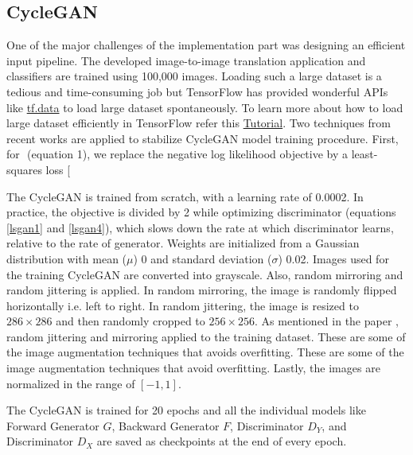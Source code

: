 \subsection{CycleGAN}
One of the major challenges of the implementation part was designing an efficient input pipeline. The developed image-to-image translation application and classifiers are trained using 100,000 images. Loading such a large dataset is a tedious and time-consuming job but TensorFlow has provided wonderful APIs like \href{https://www.tensorflow.org/guide/data}{tf.data} to load large dataset spontaneously. To learn more about how to load large dataset efficiently in TensorFlow refer this \href{https://www.tensorflow.org/tutorials/load_data/images}{Tutorial}. Two techniques from recent works are applied to stabilize \ac{CycleGAN} model training procedure. First, for $ $ (equation 1), we replace the negative log likelihood
objective by a least-squares loss [


The \ac{CycleGAN} is trained from scratch, with a learning rate of 0.0002. In practice, the objective is divided by 2 while optimizing discriminator (equations \ref{lsgan1} and \ref{lsgan4}), which slows down the rate at which discriminator learns, relative to the rate of generator.  Weights are initialized from a Gaussian distribution with mean ($\mu$) 0 and standard deviation ($\sigma$) 0.02. Images used for the training \ac{CycleGAN} are converted into grayscale. Also, random mirroring and random jittering is applied. In random mirroring, the image is randomly flipped horizontally i.e. left to right. In random jittering, the image is resized to $286 \times 286$ and then randomly cropped to $256 \times 256$. As mentioned in the paper \cite{zhu2020unpaired}, random jittering and mirroring applied to the training dataset. These are some of the image augmentation techniques that avoids overfitting. These are some of the image augmentation techniques that avoid overfitting. Lastly, the images are normalized in the range of $[-1, 1]$. 



The \ac{CycleGAN} is trained for 20 epochs and all the individual models like Forward Generator $G$, Backward Generator $F$, Discriminator $D_Y$, and Discriminator $D_X$ are saved as checkpoints at the end of every epoch. 



